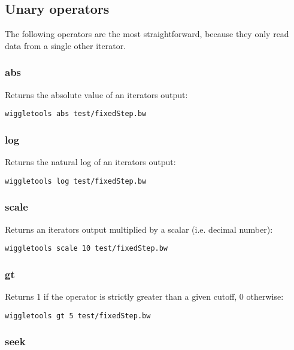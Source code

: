 \documentclass[12pt]{article}
\begin{document}
\subsection{Unary operators}

The following operators are the most straightforward, because they only read data from a single other iterator.

\subsubsection{abs}

Returns the absolute value of an iterators output:

\begin{verbatim}
wiggletools abs test/fixedStep.bw 
\end{verbatim}

\subsubsection{log}

Returns the natural log of an iterators output:

\begin{verbatim}
wiggletools log test/fixedStep.bw 
\end{verbatim}

\subsubsection{scale}

Returns an iterators output multiplied by a scalar (i.e. decimal number):

\begin{verbatim}
wiggletools scale 10 test/fixedStep.bw 
\end{verbatim}


\subsubsection{gt}

Returns 1 if the operator is strictly greater than a given cutoff, 0 otherwise:

\begin{verbatim}
wiggletools gt 5 test/fixedStep.bw 
\end{verbatim}

\subsubsection{seek}
\end{document}
